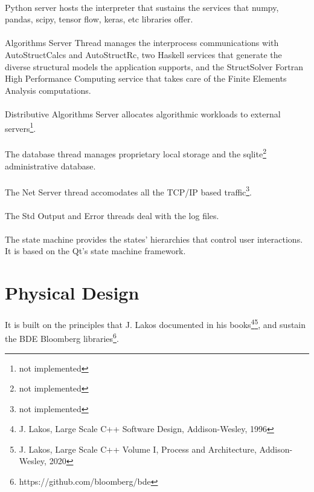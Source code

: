 \paragraph{}
Python server hosts the interpreter that sustains the services that numpy, pandas, scipy, tensor flow, keras, etc libraries offer.
\paragraph{}
Algorithms Server Thread manages the interprocess communications with AutoStructCalcs and AutoStructRc, two Haskell services that generate the diverse structural models the application supports, and the StructSolver Fortran High Performance Computing service that takes care of the Finite Elements Analysis computations.
\paragraph{}
Distributive Algorithms Server allocates algorithmic workloads to external servers\footnote{not implemented}.
\paragraph{}
The database thread manages proprietary local storage and the sqlite\footnote{not implemented} administrative database.
\paragraph{}
The Net Server thread accomodates all the TCP/IP based traffic\footnote{not implemented}.
\paragraph{}
The Std Output and Error threads deal with the log files.
\paragraph{}
The state machine provides the states' hierarchies that control user interactions. It is based on the Qt's state machine framework.
\section{Physical Design}
\paragraph{}
It is built on the principles that J. Lakos documented in his books\footnote{J. Lakos, Large Scale C++ Software Design, Addison-Wesley, 1996}\footnote{J. Lakos, Large Scale C++ Volume I, Process and Architecture, Addison-Wesley, 2020}, and sustain the BDE Bloomberg libraries\footnote{https://github.com/bloomberg/bde}. 
